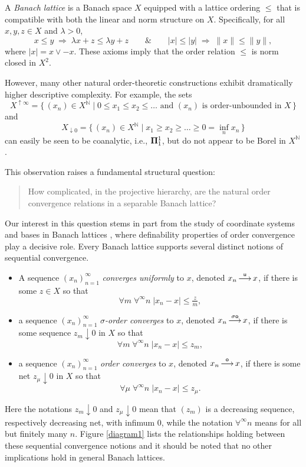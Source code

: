 \documentclass[10pt]{amsart}
\newcommand{\norm}[1]{\lVert#1\rVert}
\newcommand{\Mgd}[2]{\big\{\,  {#1}\;\big|\; {#2} \,\big\} }
\newcommand{\maps}[1]{\mathop{\overset{#1}\longrightarrow}}
\newcommand {\1}{\mathbb 1}
\newcommand {\N}{\mathbb N}
\renewcommand {\a} {\forall}
\theoremstyle{plain}
\theoremstyle{definition}
\begin{document}
A {\em Banach lattice} is a Banach space $X$ equipped with a lattice ordering $\leqslant$ that is compatible with both the linear and norm structure on $X$. Specifically,  for all $x,y,z\in X$ and $\lambda>0$, 
$$
x\leqslant y\; \Rightarrow\; \lambda x+z\leqslant \lambda y+z
\qquad\&\qquad 
|x|\leqslant |y|\;\Rightarrow \;\norm{x}\leqslant \norm{y},
$$
where $|x|=x\vee -x$. These axioms imply that the order relation  $\leqslant$ is norm closed in $X^2$.  

However, many other natural order-theoretic constructions exhibit dramatically higher descriptive complexity. For example, the sets
$$
X^{\uparrow\infty} =\Mgd{(x_n)\in X^\N}{0\leqslant x_1\leqslant x_2\leqslant \ldots \text{ and $(x_n)$ is order-unbounded in }X}$$
and 
$$ 
X_{\downarrow 0} =\Mgd{(x_n)\in X^\N}{x_1\geqslant x_2\geqslant \ldots \geqslant 0 =\inf_nx_n}
$$
can easily be seen to be coanalytic, i.e., ${\bf \Pi}^1_1$, but do not appear to be Borel in $X^\N$. 

This observation raises a fundamental structural question:
\begin{quote}
    How complicated, in the projective hierarchy, are the natural order convergence relations in a separable Banach lattice?
\end{quote}
Our interest in this question stems in part from the study of coordinate systems and bases in Banach lattices \cites{ARTT, taylor, gumenchuk}, where definability properties of order convergence play a decisive role. Every Banach lattice supports several distinct notions of sequential convergence.
\begin{itemize}
\item A sequence $(x_n)_{n=1}^\infty$ {\em converges uniformly} to $x$, denoted $x_n\maps{\sf u}x$, if there is some $z\in X$  so that
$$
\a m \;\a^\infty n\; |x_n-x|\leqslant \tfrac zm,
$$
\item a sequence $(x_n)_{n=1}^\infty$ {\em $\sigma$-order converges} to $x$, denoted $x_n\maps{\sf \sigma \sf o}x$, if there is some sequence $z_m\downarrow 0$ in $X$ so that
$$
\a m \;\a^\infty n\; |x_n-x|\leqslant z_m,
$$
\item a sequence $(x_n)_{n=1}^\infty$ {\em order converges} to $x$, denoted $x_n\maps{\sf o}x$, if there is some net $z_{\mu}\downarrow 0$ in $X$ so that
$$
\a  \mu\;\a^\infty n\; |x_n-x|\leqslant z_\mu.
$$
\end{itemize}
Here the notations $z_m\downarrow 0$ and $z_\mu\downarrow 0$ mean that $(z_m)$ is a decreasing sequence, respectively decreasing net, with infimum $0$, while the notation $\a^\infty n$ means for all but finitely many $n$. Figure \ref{diagram1} lists the relationships holding between these sequential convergence notions and it should be noted that no other implications hold in general Banach lattices. 
\end{document}
